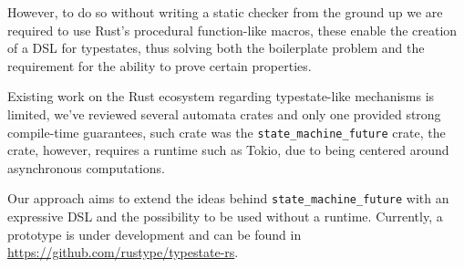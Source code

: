 \documentclass[a4paper, 10pt]{article}
\begin{document}
However, to do so without writing a static checker from the ground up we are required to use Rust's procedural function-like macros,
these enable the creation of a DSL for typestates,
thus solving both the boilerplate problem and the requirement for the ability to prove certain properties.

Existing work on the Rust ecosystem regarding typestate-like mechanisms is limited,
we've reviewed several automata crates and only one provided strong compile-time guarantees,
such crate was the \texttt{state\_machine\_future} crate, the crate, however, requires a runtime such as Tokio, due to being centered around asynchronous computations.

Our approach aims to extend the ideas behind \texttt{state\_machine\_future} with an expressive DSL and
the possibility to be used without a runtime.
Currently, a prototype is under development and can be found in \url{https://github.com/rustype/typestate-rs}.

\end{document}
